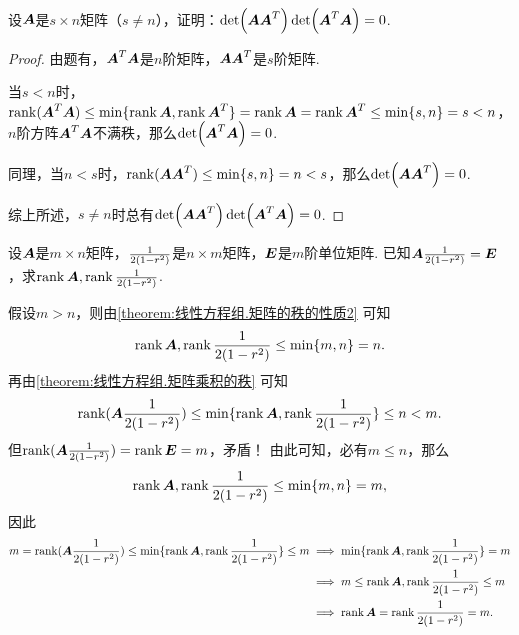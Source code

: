 \begin{example}
设\(\A\)是\(s \times n\)矩阵（\(s \neq n\)），证明：\(\det(\A \A^T) \det(\A^T \A) = 0\).
\begin{proof}
由题有，\(\A^T \A\)是\(n\)阶矩阵，\(\A \A^T\)是\(s\)阶矩阵.

当\(s < n\)时，\(\rank(\A^T \A) \leq \min\{ \rank\A, \rank\A^T \} = \rank\A = \rank\A^T \leq \min\{s,n\} = s < n\)，\(n\)阶方阵\(\A^T \A\)不满秩，那么\(\det(\A^T \A) = 0\).

同理，当\(n < s\)时，\(\rank(\A \A^T) \leq \min\{s,n\} = n < s\)，那么\(\det(\A \A^T) = 0\).

综上所述，\(s \neq n\)时总有\(\det(\A \A^T) \det(\A^T \A) = 0\).
\end{proof}
\end{example}

\begin{example}
设\(\A\)是\(m \times n\)矩阵，\(\B\)是\(n \times m\)矩阵，\(\E\)是\(m\)阶单位矩阵.
已知\(\A\B = \E\)，求\(\rank\A,\rank\B\).
\begin{solution}
假设\(m > n\)，则由\cref{theorem:线性方程组.矩阵的秩的性质2} 可知\[
\rank\A,\rank\B \leq \min\{m,n\} = n.
\]再由\cref{theorem:线性方程组.矩阵乘积的秩} 可知\[
\rank(\A\B) \leq \min\{\rank\A,\rank\B\} \leq n < m.
\]但\(\rank(\A\B) = \rank\E = m\)，矛盾！
由此可知，必有\(m \leq n\)，那么\[
\rank\A,\rank\B \leq \min\{m,n\} = m,
\]因此\begin{align*}
m = \rank(\A\B) \leq \min\{\rank\A,\rank\B\} \leq m
&\implies
\min\{\rank\A,\rank\B\} = m \\
&\implies
m \leq \rank\A,\rank\B \leq m \\
&\implies \rank\A=\rank\B=m.
\end{align*}
\end{solution}
\end{example}



